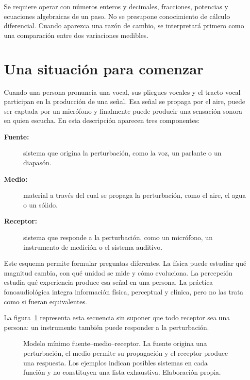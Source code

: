 Se requiere operar con números enteros y decimales, fracciones, potencias y ecuaciones algebraicas de un paso. No se presupone conocimiento de cálculo diferencial. Cuando aparezca una razón de cambio, se interpretará primero como una comparación entre dos variaciones medibles.

\section{Una situación para comenzar}
\label{sec:u1-situacion}

Cuando una persona pronuncia una vocal, sus pliegues vocales y el tracto vocal participan en la producción de una señal. Esa señal se propaga por el aire, puede ser captada por un micrófono y finalmente puede producir una sensación sonora en quien escucha. En esta descripción aparecen tres componentes:

\begin{description}
    \item[\textbf{Fuente:}] sistema que origina la perturbación, como la voz, un parlante o un diapasón.
    \item[\textbf{Medio:}] material a través del cual se propaga la perturbación, como el aire, el agua o un sólido.
    \item[\textbf{Receptor:}] sistema que responde a la perturbación, como un micrófono, un instrumento de medición o el sistema auditivo.
\end{description}

Este esquema permite formular preguntas diferentes. La física puede estudiar qué magnitud cambia, con qué unidad se mide y cómo evoluciona. La percepción estudia qué experiencia produce esa señal en una persona. La práctica fonoaudiológica integra información física, perceptual y clínica, pero no las trata como si fueran equivalentes.

La figura~\ref{fig:fuente-medio-receptor} representa esta secuencia sin suponer que todo receptor sea una persona: un instrumento también puede responder a la perturbación.

\begin{figure}[htbp]
    \centering
    
    \caption{Modelo mínimo fuente--medio--receptor. La fuente origina una perturbación, el medio permite su propagación y el receptor produce una respuesta. Los ejemplos indican posibles sistemas en cada función y no constituyen una lista exhaustiva. Elaboración propia.}
    \label{fig:fuente-medio-receptor}
\end{figure}

